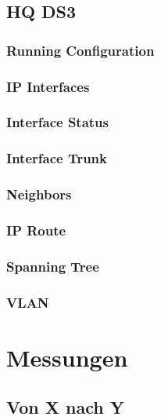 \subsection{HQ DS3}
\subsubsection{Running Configuration}


\subsubsection{IP Interfaces}


\subsubsection{Interface Status}


\subsubsection{Interface Trunk}


\subsubsection{Neighbors}


\subsubsection{IP Route}


\subsubsection{Spanning Tree}


\subsubsection{VLAN}



\section{Messungen}
\label{appendix:measures}
\subsection{Von X nach Y}




%  
% 

